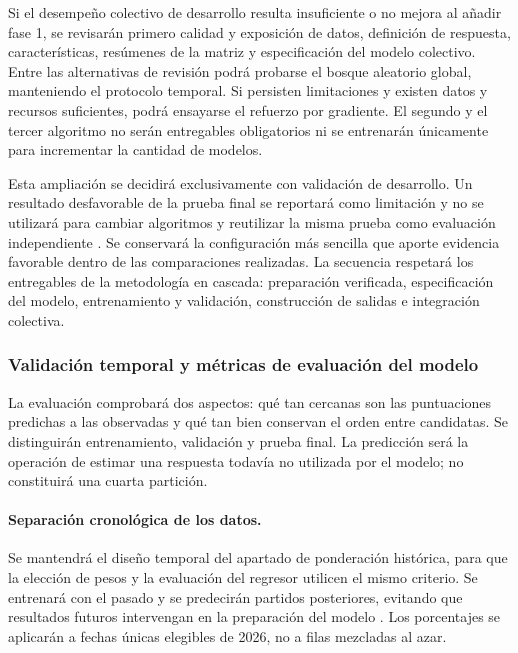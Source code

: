 Si el desempeño colectivo de desarrollo resulta insuficiente o no mejora al añadir fase 1, se revisarán primero calidad y exposición de datos, definición de respuesta, características, resúmenes de la matriz y especificación del modelo colectivo. Entre las alternativas de revisión podrá probarse el bosque aleatorio global, manteniendo el protocolo temporal. Si persisten limitaciones y existen datos y recursos suficientes, podrá ensayarse el refuerzo por gradiente. El segundo y el tercer algoritmo no serán entregables obligatorios ni se entrenarán únicamente para incrementar la cantidad de modelos.

Esta ampliación se decidirá exclusivamente con validación de desarrollo. Un resultado desfavorable de la prueba final se reportará como limitación y no se utilizará para cambiar algoritmos y reutilizar la misma prueba como evaluación independiente \cite{cawley2010selection}. Se conservará la configuración más sencilla que aporte evidencia favorable dentro de las comparaciones realizadas. La secuencia respetará los entregables de la metodología en cascada: preparación verificada, especificación del modelo, entrenamiento y validación, construcción de salidas e integración colectiva.

\endgroup

\subsubsection{Validación temporal y métricas de evaluación del modelo}
\label{subsubsec:validacion-modelo-fase1}
La evaluación comprobará dos aspectos: qué tan cercanas son las puntuaciones predichas a las observadas y qué tan bien conservan el orden entre candidatas. Se distinguirán entrenamiento, validación y prueba final. La predicción será la operación de estimar una respuesta todavía no utilizada por el modelo; no constituirá una cuarta partición.

\paragraph*{Separación cronológica de los datos.}
Se mantendrá el diseño temporal del apartado de ponderación histórica, para que la elección de pesos y la evaluación del regresor utilicen el mismo criterio. Se entrenará con el pasado y se predecirán partidos posteriores, evitando que resultados futuros intervengan en la preparación del modelo \cite{sklearnTemporal613}. Los porcentajes se aplicarán a fechas únicas elegibles de 2026, no a filas mezcladas al azar.

